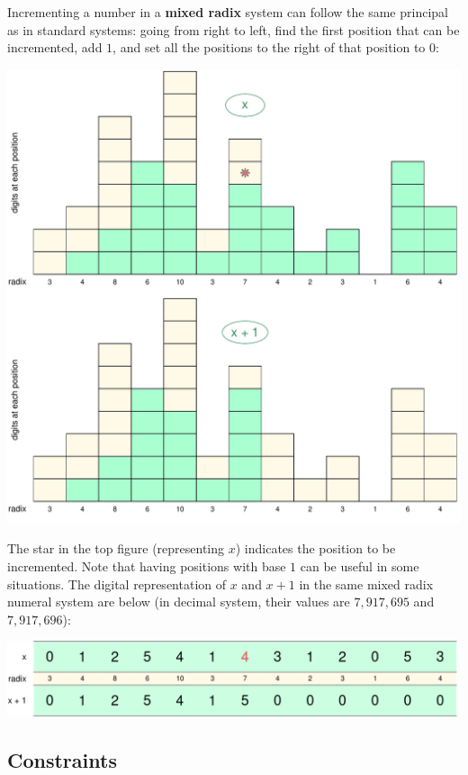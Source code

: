 \documentclass[12pt]{article}
\begin{document}
Incrementing a number in a \textbf{mixed radix} system can follow the same principal as in standard systems: going from right to left, find the first position that can be incremented, add $1$, and set all the positions to the right of that position to $0$: 
\begin{center}
  \includegraphics[scale = 0.52]{suppl/incr2.pdf} 
\end{center}

The star in the top figure (representing $x$) indicates the position to be incremented. Note that having positions with base $1$ can be useful in some situations. The digital representation of $x$ and $x + 1$ in the same mixed radix numeral system are below (in decimal system, their values are $7,917,695$ and $7,917,696$): 
\begin{center}
  \includegraphics[scale = 0.52]{suppl/incr3b.pdf}
\end{center}
\vspace{2mm} 

\subsection*{Constraints}
\end{document}
